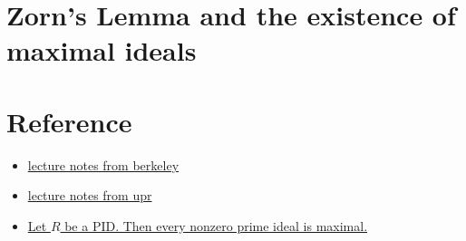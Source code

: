 \section{Zorn's Lemma and the existence of maximal ideals}

\section{Reference}

\begin{itemize}
    \item \href{https://math.berkeley.edu/~mcivor/math113su16/113ringnotes2016.pdf}{lecture notes from berkeley}
    \item \href{https://osebje.famnit.upr.si/~russ.woodroofe/wustl-notes/zorn.pdf}{lecture notes from upr}
    \item \href{https://crypto.stanford.edu/pbc/notes/commalg/factorization.html}{Let $R$ be a PID. Then every nonzero prime ideal is maximal.}
\end{itemize}